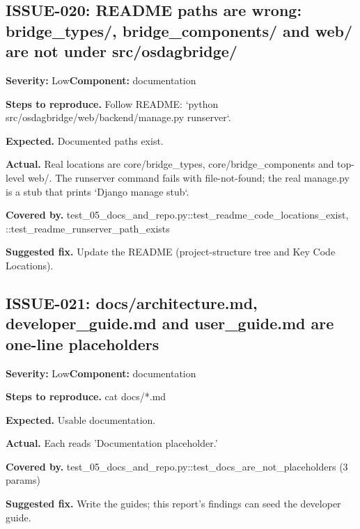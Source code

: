 \subsection*{ISSUE-020: README paths are wrong: bridge\_\allowbreak{}types/\allowbreak{}, bridge\_\allowbreak{}components/\allowbreak{} and web/\allowbreak{} are not under src/\allowbreak{}osdagbridge/\allowbreak{}}
\textbf{Severity:} Low\quad \textbf{Component:} documentation\par
\textbf{Steps to reproduce.} Follow README: `python src/\allowbreak{}osdagbridge/\allowbreak{}web/\allowbreak{}backend/\allowbreak{}manage.\allowbreak{}py runserver`.\allowbreak{}\par
\textbf{Expected.} Documented paths exist.\allowbreak{}\par
\textbf{Actual.} Real locations are core/\allowbreak{}bridge\_\allowbreak{}types, core/\allowbreak{}bridge\_\allowbreak{}components and top-level web/\allowbreak{}.\allowbreak{} The runserver command fails with file-not-found; the real manage.\allowbreak{}py is a stub that prints `Django manage stub`.\allowbreak{}\par
\textbf{Covered by.} test\_\allowbreak{}05\_\allowbreak{}docs\_\allowbreak{}and\_\allowbreak{}repo.\allowbreak{}py::\allowbreak{}test\_\allowbreak{}readme\_\allowbreak{}code\_\allowbreak{}locations\_\allowbreak{}exist, ::\allowbreak{}test\_\allowbreak{}readme\_\allowbreak{}runserver\_\allowbreak{}path\_\allowbreak{}exists\par
\textbf{Suggested fix.} Update the README (project-structure tree and Key Code Locations).\allowbreak{}

\subsection*{ISSUE-021: docs/\allowbreak{}architecture.\allowbreak{}md, developer\_\allowbreak{}guide.\allowbreak{}md and user\_\allowbreak{}guide.\allowbreak{}md are one-line placeholders}
\textbf{Severity:} Low\quad \textbf{Component:} documentation\par
\textbf{Steps to reproduce.} cat docs/\allowbreak{}*.\allowbreak{}md\par
\textbf{Expected.} Usable documentation.\allowbreak{}\par
\textbf{Actual.} Each reads 'Documentation placeholder.\allowbreak{}'\par
\textbf{Covered by.} test\_\allowbreak{}05\_\allowbreak{}docs\_\allowbreak{}and\_\allowbreak{}repo.\allowbreak{}py::\allowbreak{}test\_\allowbreak{}docs\_\allowbreak{}are\_\allowbreak{}not\_\allowbreak{}placeholders (3 params)\par
\textbf{Suggested fix.} Write the guides; this report's findings can seed the developer guide.\allowbreak{}

